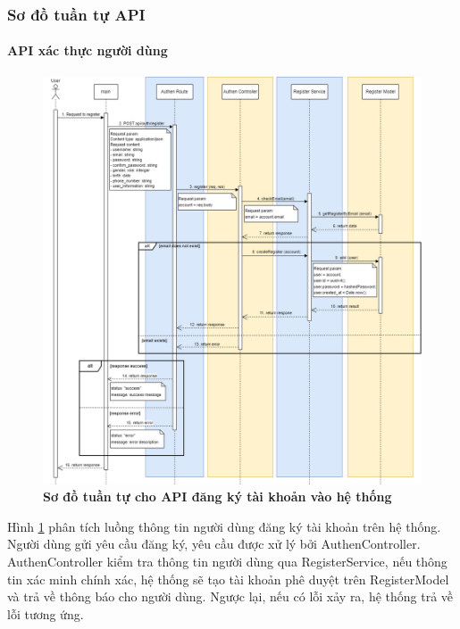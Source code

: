 \subsubsection{Sơ đồ tuần tự API}



\paragraph{API xác thực người dùng}
\mbox{}

\begin{figure}[H]
  \centering
  \includegraphics[scale=0.4]{Images/sequence_api/register.png}
  \caption[Sơ đồ tuần tự cho API đăng ký tài khoản vào hệ thống]{\bfseries \fontsize{12pt}{0pt}
  \selectfont Sơ đồ tuần tự cho API đăng ký tài khoản vào hệ thống }
  \label{api_register} %
\end{figure}
Hình \ref{api_register} phân tích luồng thông tin người dùng đăng ký tài khoản trên hệ thống. Người dùng gửi yêu cầu đăng ký, yêu cầu được xử lý bởi AuthenController. AuthenController kiểm tra thông tin người dùng qua RegisterService, 
nếu thông tin xác minh chính xác, hệ thống sẽ tạo tài khoản phê duyệt trên RegisterModel và trả về thông báo cho người dùng. Ngược lại, nếu có lỗi xảy ra, hệ thống trả về lỗi tương ứng. 

